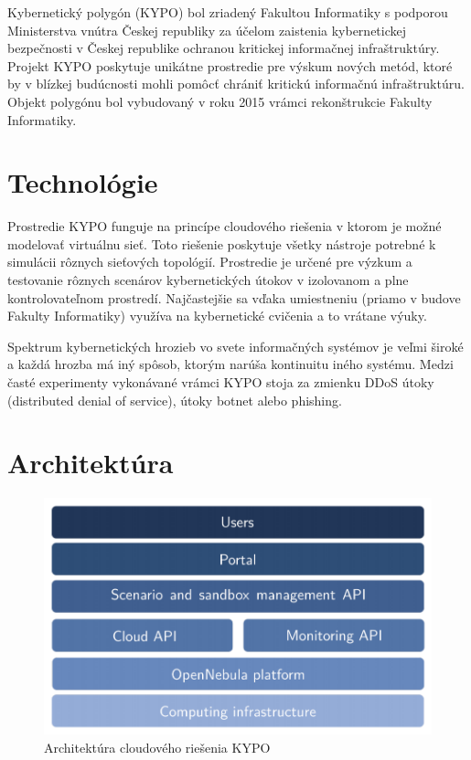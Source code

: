 \documentclass[
  digital, %
  twoside, %
  notable,   %
  nolof,   %
  nolot,   %
]{fithesis3}
\begin{document}
Kybernetický polygón (KYPO) bol zriadený Fakultou Informatiky s podporou Ministerstva vnútra Českej republiky za účelom zaistenia kybernetickej bezpečnosti v Českej republike ochranou kritickej informačnej infraštruktúry. Projekt KYPO poskytuje unikátne prostredie pre výskum nových metód, ktoré by v blízkej budúcnosti mohli pomôcť chrániť kritickú informačnú infraštruktúru\cite{dankovvcikova2015konfigurace}. Objekt polygónu bol vybudovaný v roku 2015 vrámci rekonštrukcie Fakulty Informatiky.

\section{Technológie}
Prostredie KYPO funguje na princípe cloudového riešenia v ktorom je možné modelovať virtuálnu sieť\cite{eichler2014analytical}. Toto riešenie poskytuje všetky nástroje potrebné k simulácii rôznych sieťových topológií. Prostredie je určené pre výzkum a testovanie rôznych scenárov kybernetických útokov v izolovanom a plne kontrolovateľnom prostredí\cite{vceleda2015kypo}. Najčastejšie sa vďaka umiestneniu (priamo v budove Fakulty Informatiky) využíva na kybernetické cvičenia a to vrátane výuky.

Spektrum kybernetických hrozieb vo svete informačných systémov je veľmi široké a každá hrozba má iný spôsob, ktorým narúša kontinuitu iného systému. Medzi časté experimenty vykonávané vrámci KYPO stoja za zmienku DDoS útoky (distributed denial of service), útoky botnet alebo phishing\cite{vcegan2014navrh, celeda2013projekt}.

\section{Architektúra}
\begin{figure}
	\center
	\includegraphics[width=1.0\linewidth]{kypo_structure}
	\caption{Architektúra cloudového riešenia KYPO\cite{vceleda2015kypo}}
	\label{kypo_structure}
\end{figure}
\end{document}
